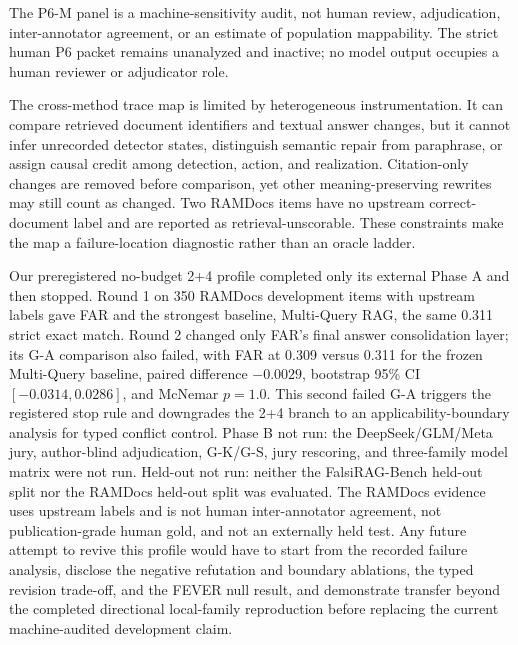 \documentclass[letterpaper]{article}
\begin{document}
The P6-M panel is a machine-sensitivity audit, not human review,
adjudication, inter-annotator agreement, or an estimate of population
mappability. The strict human P6 packet remains unanalyzed and inactive; no
model output occupies a human reviewer or adjudicator role.

The cross-method trace map is limited by heterogeneous instrumentation. It can
compare retrieved document identifiers and textual answer changes, but it cannot
infer unrecorded detector states, distinguish semantic repair from paraphrase,
or assign causal credit among detection, action, and realization. Citation-only
changes are removed before comparison, yet other meaning-preserving rewrites may
still count as changed. Two RAMDocs items have no upstream correct-document
label and are reported as retrieval-unscorable. These constraints make the map
a failure-location diagnostic rather than an oracle ladder.

Our preregistered no-budget 2+4 profile completed only its external Phase A and
then stopped. Round 1 on 350 RAMDocs development items with upstream labels gave
FAR and the strongest baseline, Multi-Query RAG, the same 0.311 strict exact
match. Round 2 changed only FAR's final answer consolidation layer; its G-A
comparison also failed, with FAR at 0.309 versus 0.311 for the frozen
Multi-Query baseline, paired difference $-0.0029$, bootstrap 95\% CI
$[-0.0314,0.0286]$, and McNemar $p=1.0$. This second failed G-A triggers the
registered stop rule and downgrades the 2+4 branch to an
applicability-boundary analysis for typed conflict control. Phase B not run:
the DeepSeek/GLM/Meta jury, author-blind adjudication, G-K/G-S, jury rescoring,
and three-family model matrix were not run. Held-out not run: neither the
FalsiRAG-Bench held-out split nor the RAMDocs held-out split was evaluated.
The RAMDocs evidence uses upstream labels and is not human inter-annotator
agreement, not publication-grade human gold, and not an externally held test.
Any future attempt to revive this profile would have to start from the recorded
failure analysis, disclose the negative refutation and boundary ablations, the
typed revision trade-off, and the FEVER null result, and demonstrate transfer
beyond the completed directional local-family reproduction before replacing
the current machine-audited development claim.
\end{document}
